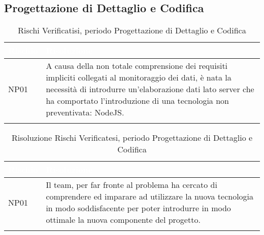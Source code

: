\subsection{Progettazione di Dettaglio e Codifica}\label{ARRQ}
\begin{longtable}{|C{.15\textwidth}|C{.79\textwidth}|}
	\hline
	\textbf{\textcolor{white}{Rischio}} & \textbf{\textcolor{white}{Risoluzione}} \\
	\hline \hline
	\endfirsthead
	NP01 & A causa della non totale comprensione dei requisiti impliciti collegati al monitoraggio dei dati, è nata la necessità di introdurre un'elaborazione dati lato server che ha comportato l'introduzione di una tecnologia non preventivata: NodeJS.\\ 
	\hline
	\caption{Rischi Verificatisi, periodo Progettazione di Dettaglio e Codifica}
	\label{tab:analisiRischiRQ}
\end{longtable}

\begin{longtable}{|C{.15\textwidth}|C{.79\textwidth}|}
	\hline
	\textbf{\textcolor{white}{Rischio}} & \textbf{\textcolor{white}{Risoluzione}} \\
	\hline \hline
	\endfirsthead
	NP01 & Il team, per far fronte al problema ha cercato di comprendere ed imparare ad utilizzare la nuova tecnologia in modo soddisfacente per poter introdurre in modo ottimale la nuova componente del progetto.\\ 
	\hline
	\caption{Risoluzione Rischi Verificatesi, periodo Progettazione di Dettaglio e Codifica}
	\label{tab:risoluzioneRischiRQ}
\end{longtable}

\pagebreak


